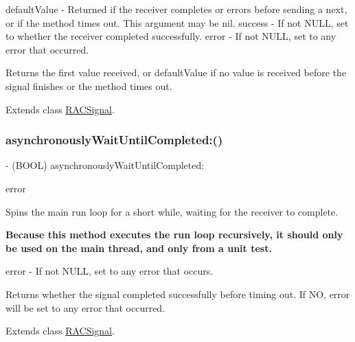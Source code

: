 default\+Value -\/ Returned if the receiver completes or errors before sending a {\ttfamily next}, or if the method times out. This argument may be nil. success -\/ If not N\+U\+LL, set to whether the receiver completed successfully. error -\/ If not N\+U\+LL, set to any error that occurred.

Returns the first value received, or {\ttfamily default\+Value} if no value is received before the signal finishes or the method times out. 

Extends class \mbox{\hyperlink{interface_r_a_c_signal_a477114852c0e761a023a35e35ccc1784}{R\+A\+C\+Signal}}.

\mbox{\label{category_r_a_c_signal_07_testing_08_a29ac4be53792963e1c7e5c59e545e6cd}} 
\subsubsection{\texorpdfstring{asynchronously\+Wait\+Until\+Completed\+:()}{asynchronouslyWaitUntilCompleted:()}\hspace{0.1cm}{\footnotesize\ttfamily [1/3]}}
{\footnotesize\ttfamily -\/ (B\+O\+OL) asynchronously\+Wait\+Until\+Completed\+: \begin{DoxyParamCaption}\item[{(N\+S\+Error $\ast$$\ast$)}]{error }\end{DoxyParamCaption}}

Spins the main run loop for a short while, waiting for the receiver to complete.

{\bfseries Because this method executes the run loop recursively, it should only be used on the main thread, and only from a unit test.}

error -\/ If not N\+U\+LL, set to any error that occurs.

Returns whether the signal completed successfully before timing out. If NO, {\ttfamily error} will be set to any error that occurred. 

Extends class \mbox{\hyperlink{interface_r_a_c_signal_a29ac4be53792963e1c7e5c59e545e6cd}{R\+A\+C\+Signal}}.

\mbox{\label{category_r_a_c_signal_07_testing_08_a29ac4be53792963e1c7e5c59e545e6cd}} 
